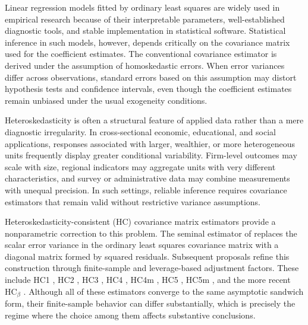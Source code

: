 Linear regression models fitted by ordinary least squares are widely used in empirical research because of their interpretable parameters, well-established diagnostic tools, and stable implementation in statistical software. Statistical inference in such models, however, depends critically on the covariance matrix used for the coefficient estimates. The conventional covariance estimator is derived under the assumption of homoskedastic errors. When error variances differ across observations, standard errors based on this assumption may distort hypothesis tests and confidence intervals, even though the coefficient estimates remain unbiased under the usual exogeneity conditions.

Heteroskedasticity is often a structural feature of applied data rather than a mere diagnostic irregularity. In cross-sectional economic, educational, and social applications, responses associated with larger, wealthier, or more heterogeneous units frequently display greater conditional variability. Firm-level outcomes may scale with size, regional indicators may aggregate units with very different characteristics, and survey or administrative data may combine measurements with unequal precision. In such settings, reliable inference requires covariance estimators that remain valid without restrictive variance assumptions.

Heteroskedasticity-consistent (HC) covariance matrix estimators provide a nonparametric correction to this problem. The seminal estimator of \citet{White1980} replaces the scalar error variance in the ordinary least squares covariance matrix with a diagonal matrix formed by squared residuals. Subsequent proposals refine this construction through finite-sample and leverage-based adjustment factors. These include HC1 \citep{Hinkley1977}, HC2 \citep{MacKinnonWhite1985}, HC3 \citep{MacKinnonWhite1985, DavidsonMacKinnon1993}, HC4 \citep{CribariNeto2004}, HC4m \citep{CribariNetoDaSilva2011}, HC5 \citep{CribariNetoSouzaVasconcellos2007}, HC5m \citep{Li2016}, and the more recent \(\text{HC}_\beta\) \citep{Cunha+Cribari+Marinho_2026_arXiv}. Although all of these estimators converge to the same asymptotic sandwich form, their finite-sample behavior can differ substantially, which is precisely the regime where the choice among them affects substantive conclusions.

